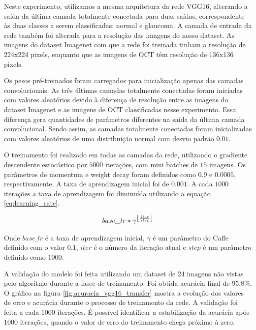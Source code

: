 \documentclass[conference]{IEEEtran}
\DeclarePairedDelimiter\floor{\lfloor}{\rfloor}
\begin{document}


  Neste experimento, utilizamos a mesma arquitetura da rede VGG16, alterando a saída da última camada totalmente conectada para duas saídas, correspondente às duas classes a serem classificadas: normal e glaucoma. A camada de entrada da rede também foi alterada para a resolução das imagens do nosso dataset. As imagens do dataset Imagenet com que a rede foi treinada tinham a resolução de 224x224 pixels, enquanto que as imagens de OCT têm resolução de 136x136 pixels.
  
  Os pesos pré-treinados foram carregados para inicialização apenas das camadas convolucionais. As três últimas camadas totalmente conectadas foram iniciadas com valores aleatórios devido à diferença de resolução entre as imagens do dataset Imagenet e as imagens de OCT classificadas nesse experimento. Essa diferença gera quantidades de parâmetros diferentes na saída da última camada convolucional. Sendo assim, as camadas totalmente conectadas foram inicializadas com valores aleatórios de uma distribuição normal com desvio padrão $0.01$.

  O treinamento foi realizado em todas as camadas da rede, utilizando o gradiente descendente estocástico por $5000$ iterações, com mini batches de $15$ imagens. Os parâmetros de momentum e weight decay foram definidos como $0.9$ e $0.0005$, respectivamente. A taxa de aprendizagem inicial foi de $0.001$. A cada $1000$ iterações a taxa de aprendizagem foi diminuída utilizando a equação \ref{eq:learning_rate}.

  \begin{equation}
    base\_lr * \gamma^{\floor*{\frac{iter}{step}}}
    \label{eq:learning_rate}
  \end{equation}

  Onde $base\_lr$ é a taxa de aprendizagem inicial, $\gamma$ é um parâmetro do Caffe definido com o valor $0.1$, $iter$ é o número da iteração atual e $step$ é um parâmetro definido como $1000$.

  A validação do modelo foi feita utilizando um dataset de 24 imagens não vistas pelo algoritmo durante a fasee de treinamento. Foi obtida acurácia final de $95.8\%$. O gráfico na figura \ref{fig:acuracia_vgg16_transfer} mostra a evolução dos valores de erro e acurácia durante o processo de treinamento da rede. A validação foi feita a cada $1000$ iterações. É possível identificar a estabilização da acurácia após $1000$ iterações, quando o valor de erro do treinamento chega próximo à zero.
\end{document}
